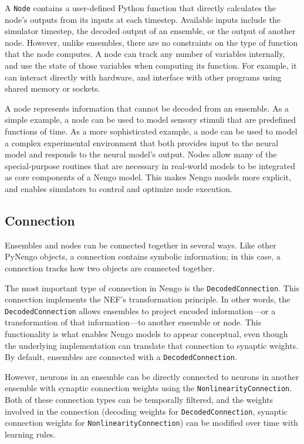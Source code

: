 \documentclass{frontiersSCNS}
\begin{document}
A \texttt{Node} contains a user-defined
Python function that directly calculates
the node's outputs from its inputs at each timestep.
Available inputs include
the simulator timestep,
the decoded output of an ensemble,
or the output of another node.
However, unlike ensembles,
there are no constraints on the type
of function that the node computes.
A node can track any number of variables internally,
and use the state of those variables
when computing its function.
For example, it can interact directly with hardware,
and interface with other programs
using shared memory or sockets.

A node represents information
that cannot be decoded from an ensemble.
As a simple example,
a node can be used to model sensory stimuli
that are predefined functions of time.
As a more sophisticated example,
a node can be used to model
a complex experimental environment that
both provides input to the neural model
and responds to the neural model's output.
Nodes allow many of the special-purpose
routines that are necessary in real-world
models to be integrated
as core components of a Nengo model.
This makes Nengo models more explicit,
and enables simulators
to control and optimize node execution.

\subsection{Connection}

Ensembles and nodes can be connected together
in several ways.
Like other PyNengo objects,
a connection contains symbolic information;
in this case, a connection tracks
how two objects are connected together.

The most important type of connection
in Nengo is the \texttt{DecodedConnection}.
This connection implements
the NEF's transformation principle.
In other words, the \texttt{DecodedConnection}
allows ensembles to project
encoded information---or
a transformation of that information---to
another ensemble or node.
This functionality is what enables Nengo models
to appear conceptual,
even though the underlying implementation
can translate that connection
to synaptic weights.
By default, ensembles are connected
with a \texttt{DecodedConnection}.

However, neurons in an ensemble can be directly connected
to neurons in another ensemble
with synaptic connection weights
using the \texttt{NonlinearityConnection}.
Both of these connection types
can be temporally filtered,
and the weights involved in the connection
(decoding weights for \texttt{DecodedConnection},
synaptic connection weights for \texttt{NonlinearityConnection})
can be modified over time with learning rules.
\end{document}
